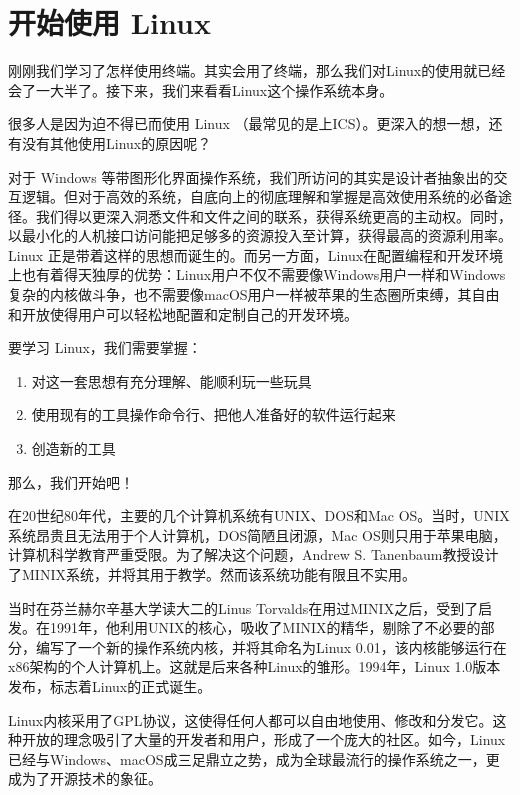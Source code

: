 \chapter{开始使用 Linux}\label{chap:linux}

刚刚我们学习了怎样使用终端。其实会用了终端，那么我们对Linux的使用就已经会了一大半了。接下来，我们来看看Linux这个操作系统本身。

很多人是因为迫不得已而使用 Linux \faLinux（最常见的是上ICS）。更深入的想一想，还有没有其他使用Linux的原因呢？

对于 Windows 等带图形化界面操作系统，我们所访问的其实是设计者抽象出的交互逻辑。但对于高效的系统，自底向上的彻底理解和掌握是高效使用系统的必备途径。我们得以更深入洞悉文件和文件之间的联系，获得系统更高的主动权。同时，以最小化的人机接口访问能把足够多的资源投入至计算，获得最高的资源利用率。Linux 正是带着这样的思想而诞生的。而另一方面，Linux在配置编程和开发环境上也有着得天独厚的优势：Linux用户不仅不需要像Windows用户一样和Windows复杂的内核做斗争，也不需要像macOS用户一样被苹果的生态圈所束缚，其自由和开放使得用户可以轻松地配置和定制自己的开发环境。

要学习 Linux，我们需要掌握：

\begin{enumerate}
  \item 对这一套思想有充分理解、能顺利玩一些玩具
  \item 使用现有的工具操作命令行、把他人准备好的软件运行起来
  \item 创造新的工具
\end{enumerate}

那么，我们开始吧！

\begin{reading}
在20世纪80年代，主要的几个计算机系统有UNIX、DOS和Mac OS。当时，UNIX系统昂贵且无法用于个人计算机，DOS简陋且闭源，Mac OS则只用于苹果电脑，计算机科学教育严重受限。为了解决这个问题，Andrew S. Tanenbaum教授设计了MINIX系统，并将其用于教学。然而该系统功能有限且不实用。

当时在芬兰赫尔辛基大学读大二的Linus Torvalds在用过MINIX之后，受到了启发。在1991年，他利用UNIX的核心，吸收了MINIX的精华，剔除了不必要的部分，编写了一个新的操作系统内核，并将其命名为Linux 0.01，该内核能够运行在x86架构的个人计算机上。这就是后来各种Linux的雏形。1994年，Linux 1.0版本发布，标志着Linux的正式诞生。

Linux内核采用了GPL协议，这使得任何人都可以自由地使用、修改和分发它。这种开放的理念吸引了大量的开发者和用户，形成了一个庞大的社区。如今，Linux已经与Windows、macOS成三足鼎立之势，成为全球最流行的操作系统之一，更成为了开源技术的象征。
\end{reading}

